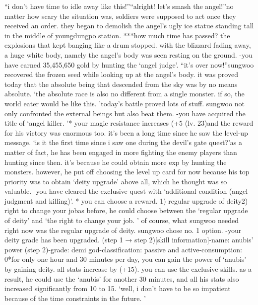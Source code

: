 “i don’t have time to idle away like this!”“alright! let’s smash the angel!”no matter how scary the situation was, soldiers were supposed to act once they received an order.
they began to demolish the angel’s ugly ice statue standing tall in the middle of youngdungpo station.
***how much time has passed? the explosions that kept banging like a drum stopped.
 with the blizzard fading away, a huge white body, namely the angel’s body was seen resting on the ground.
-you have earned 35,455,650 gold by hunting the ‘angel judge’.
“it’s over now!”sungwoo recovered the frozen seed while looking up at the angel’s body.
 it was proved today that the absolute being that descended from the sky was by no means absolute.
‘the absolute race is also no different from a single monster.
 if so, the world eater would be like this.
’today’s battle proved lots of stuff.
 sungwoo not only confronted the external beings but also beat them.
-you have acquired the title of ‘angel killer.
’* your magic resistance increases (+5%
 (lv.
 23)and the reward for his victory was enormous too.
 it’s been a long time since he saw the level-up message.
‘is it the first time since i saw one during the devil’s gate quest?’as a matter of fact, he has been engaged in more fighting the enemy players than hunting since then.
 it’s because he could obtain more exp by hunting the monsters.
however, he put off choosing the level up card for now because his top priority was to obtain ‘deity upgrade’ above all, which he thought was so valuable.
-you have cleared the exclusive quest  with ‘additional condition (angel judgment and killing)’.
* you can choose a reward.
1) regular upgrade of deity2) right to change your jobas before, he could choose between the ‘regular upgrade of deity’ and ‘the right to change your job.
’ of course, what sungwoo needed right now was the regular upgrade of deity.
sungwoo chose no.
 1 option.
-your deity grade has been upgraded.
 (step 1 → step 2)[skill information]-name: anubis’ power (step 2)-grade: demi god-classification: passive and active-consumption: 0*for only one hour and 30 minutes per day, you can gain the power of ‘anubis’ by gaining deity.
 all stats increase by (+15).
 you can use the exclusive skills.
as a result, he could use the ‘anubis’ for another 30 minutes, and all his stats also increased significantly from 10 to 15.
‘well, i don’t have to be so impatient because of the time constraints in the future.
’

